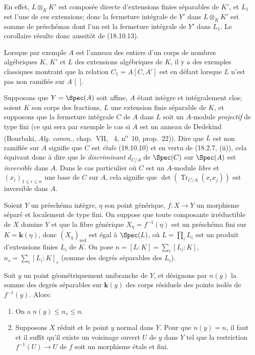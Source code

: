 En effet, $L\otimes_K K'$ est composée directe d'extensions finies séparables de $K'$, et $L_1$
est l'une de ces extensions; donc la fermeture intégrale de $Y'$ dans $L\otimes_K K'$ est somme de préschémas dont l'un est la fermeture intégrale de $Y'$ dans $L_1$. Le corollaire résulte donc aussitôt de (18.10.13).

Lorsque par exemple $A$ est l'anneau des entiers d'un corps de nombres algébriques $K$, $K'$ et $L$ des extensions algébriques de $K$, il y a des exemples classiques montrant que la relation $C_1=A[C,A']$ est en défaut lorsque $L$ n'est pas non ramifiée sur $A$ [\ ].

\begin{env}[18.10.15]
\label{IV.18.10.15}
Supposons que $Y=\Spec(A)$ soit affine, $A$ étant intègre et intégralement clos; soient $K$ son corps des fractions, $L$ une extension finie séparable de $K$, et supposons que la fermeture intégrale $C$ de $A$ dans $L$ soit un $A$-module \emph{projectif} de type fini (ce qui sera par exemple le cas si $A$ est un anneau de Dedekind (Bourbaki, \emph{Alg. comm.}, chap.~VII, \textsection~4, n\textsuperscript{o}~10, prop.~22)). Dire que $L$ est non ramifiée sur $A$ signifie que $C$ est \emph{étale} (18.10.10) et en vertu de (18.2.7, (ii)), cela équivaut donc à dire que le \emph{discriminant} $d_{C/A}$ de $\Spec(C)$ sur $\Spec(A)$ est \emph{inversible} dans $A$. Dans le cas particulier où $C$ est un $A$-module \emph{libre} et $(x_i)_{1\leq i\leq n}$ une base de $C$ sur $A$, cela signifie que $\det(\operatorname{Tr}_{C/A}(x_ix_j))$ est inversible dans $A$.
\end{env}

\begin{theorem}[18.10.16]
\label{IV.18.10.16}
Soient $Y$ un préschéma intègre, $\eta$ son point générique, $f:X\to Y$ un morphisme séparé et localement de type fini. On suppose que toute composante irréductible de $X$ domine $Y$ et que la fibre générique $X_\eta=f^{-1}(\eta)$ est un préschéma fini sur $K=\boldsymbol{k}(\eta)$, donc $(X_\eta)_{\mathrm{red}}$ est égal à $\Spec(L)$, où $L=\prod_iL_i$ est un produit d'extensions finies $L_i$ de $K$. On pose $n=[L:K]=\sum_i[L_i:K]$, $n_s=\sum_i[L_i:K]_s$ \textup{(somme des degrés séparables des $L_i$)}.

Soit $y$ un point \textup{géométriquement unibranche} de $Y$, et désignons par $n(y)$ la somme des degrés séparables sur $\boldsymbol{k}(y)$ des corps résiduels des points \textup{isolés} de $f^{-1}(y)$. Alors:
\begin{enumerate}
  \item[\textup{(i)}] On a $n(y)\leq n_s\leq n$.
  \item[\textup{(ii)}] Supposons $X$ réduit et le point $y$ normal dans $Y$. Pour que $n(y)=n$, il faut et il suffit qu'il existe un voisinage ouvert $U$ de $y$ dans $Y$ tel que la restriction $f^{-1}(U)\to U$ de $f$ soit un morphisme étale et fini.
\end{enumerate}
\end{theorem}

